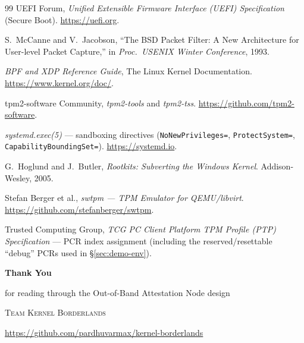 \documentclass[11pt,a4paper]{article}
\begin{document}
\begin{thebibliography}{99}
 UEFI Forum, \emph{Unified Extensible Firmware Interface (UEFI) Specification} (Secure Boot). \url{https://uefi.org}.

 S.~McCanne and V.~Jacobson, ``The BSD Packet Filter: A New Architecture for User-level Packet Capture,'' in \emph{Proc.\ USENIX Winter Conference}, 1993.

 \emph{BPF and XDP Reference Guide}, The Linux Kernel Documentation. \url{https://www.kernel.org/doc/}.

 tpm2-software Community, \emph{tpm2-tools} and \emph{tpm2-tss}. \url{https://github.com/tpm2-software}.

 \emph{systemd.exec(5)} --- sandboxing directives (\texttt{NoNewPrivileges=}, \texttt{ProtectSystem=}, \texttt{CapabilityBoundingSet=}). \url{https://systemd.io}.

 G.~Hoglund and J.~Butler, \emph{Rootkits: Subverting the Windows Kernel}. Addison-Wesley, 2005.

 Stefan Berger et al., \emph{swtpm --- TPM Emulator for QEMU/libvirt}. \url{https://github.com/stefanberger/swtpm}.

 Trusted Computing Group, \emph{TCG PC Client Platform TPM Profile (PTP) Specification} --- PCR index assignment (including the reserved/resettable ``debug'' PCRs used in \S\ref{sec:demo-env}).

\end{thebibliography}

\clearpage
\thispagestyle{empty}
\begin{center}
\vspace*{\fill}

{\small{}}

\vspace{1.4cm}

{\fontsize{22}{26}\selectfont\bfseries Thank You}

\vspace{0.6em}

{\normalsize for reading through the Out-of-Band Attestation Node design}

\vspace{1.8cm}

{\small \scshape Team Kernel Borderlands}

\vspace{0.9em}

{\small \url{https://github.com/pardhuvarmax/kernel-borderlands}}

\vspace*{\fill}
\end{center}
\end{document}
